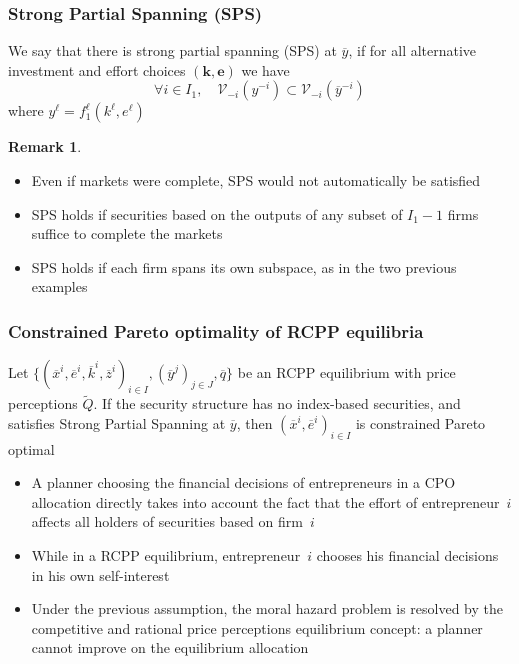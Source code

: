 \documentclass[blue]{beamer}
\theoremstyle{definition}
\theoremstyle{example}
\newtheorem*{remark}{Remark}
\begin{document}
\begin{frame}\frametitle{Strong Partial Spanning (SPS)}



\begin{definition}
We say that there is \alert{strong partial spanning} (SPS) at $\overline{y}$, if for all alternative investment and effort choices $(\bm{k},\bm{e})$ we have
\[
\forall i\in I_1, \quad \mathcal{V}_{-i}(y^{-i}) \subset \mathcal{V}_{-i}(\overline{y}^{-i})
\]
where $y^\ell = f^\ell_1(k^\ell,e^\ell)$
\end{definition}


\begin{remark}
\begin{itemize}
\item Even if markets were complete, SPS would not automatically be satisfied
\item SPS holds if securities based on the outputs of any subset of $I_1-1$ firms suffice to complete the markets
\item SPS holds if each firm spans its own subspace, as in the two previous examples
\end{itemize}
\end{remark}

\end{frame}


\begin{frame}\frametitle{Constrained Pareto optimality of RCPP equilibria}

\begin{theorem}
Let $\{(\overline{x}^i,\overline{e}^i,\overline{k}^i,\overline{z}^i)_{i\in I},(\overline{y}^j)_{j\in J},\overline{q}\}$ be an RCPP equilibrium with price perceptions $\widetilde{Q}$.
If the security structure has no index-based securities, and satisfies Strong Partial Spanning at $\overline{y}$, then $(\overline{x}^i,\overline{e}^i)_{i\in I}$ is constrained Pareto optimal
\end{theorem}

\begin{itemize}
\item A planner choosing the financial decisions of entrepreneurs in a CPO allocation directly takes into account the fact that the effort of entrepreneur~$i$ affects all holders of securities based on
firm~$i$
\item While in a RCPP equilibrium, entrepreneur~$i$ chooses his financial decisions in his own self-interest
\item Under the previous assumption, the moral hazard problem is resolved by the competitive and rational price perceptions equilibrium concept: a planner cannot improve on the equilibrium
allocation
\end{itemize}

\end{frame}
\end{document}

